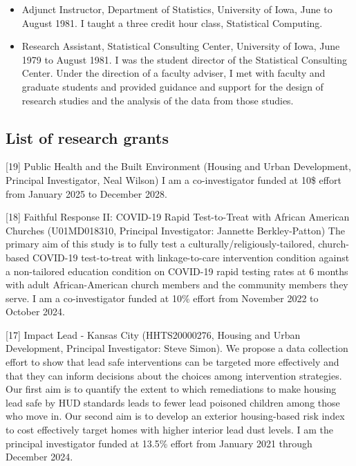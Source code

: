 \documentclass[
  12pt,
]{article}
\begin{document}
\begin{itemize}
  Research, Bowling Green State University, September 1981 to May 1987.
  Duties included teaching and research. I taught Business Statistics,
  Experimental Design, Linear Models, Multivariate Statistics,
  Nonparametric Statistics, and Linear Regression. I published articles
  and made presentations in the areas of numerical accuracy, robust
  statistics, and computer applications. During the Summer of 1986, I
  served as the Assistant Director of the Statistical Consulting Center.
\item
  Adjunct Instructor, Department of Statistics, University of Iowa, June
  to August 1981. I taught a three credit hour class, Statistical
  Computing.
\item
  Research Assistant, Statistical Consulting Center, University of Iowa,
  June 1979 to August 1981. I was the student director of the
  Statistical Consulting Center. Under the direction of a faculty
  adviser, I met with faculty and graduate students and provided
  guidance and support for the design of research studies and the
  analysis of the data from those studies.
\end{itemize}

\subsection{List of research grants}\label{list-of-research-grants}

{[}19{]} Public Health and the Built Environment (Housing and Urban
Development, Principal Investigator, Neal Wilson) I am a co-investigator
funded at 10\$ effort from January 2025 to December 2028.

{[}18{]} Faithful Response II: COVID-19 Rapid Test-to-Treat with African
American Churches (U01MD018310, Principal Investigator: Jannette
Berkley-Patton) The primary aim of this study is to fully test a
culturally/religiously-tailored, church-based COVID-19 test-to-treat
with linkage-to-care intervention condition against a non-tailored
education condition on COVID-19 rapid testing rates at 6 months with
adult African-American church members and the community members they
serve. I am a co-investigator funded at 10\% effort from November 2022
to October 2024.

{[}17{]} Impact Lead - Kansas City (HHTS20000276, Housing and Urban
Development, Principal Investigator: Steve Simon). We propose a data
collection effort to show that lead safe interventions can be targeted
more effectively and that they can inform decisions about the choices
among intervention strategies. Our first aim is to quantify the extent
to which remediations to make housing lead safe by HUD standards leads
to fewer lead poisoned children among those who move in. Our second aim
is to develop an exterior housing-based risk index to cost effectively
target homes with higher interior lead dust levels. I am the principal
investigator funded at 13.5\% effort from January 2021 through December
2024.
\end{document}
